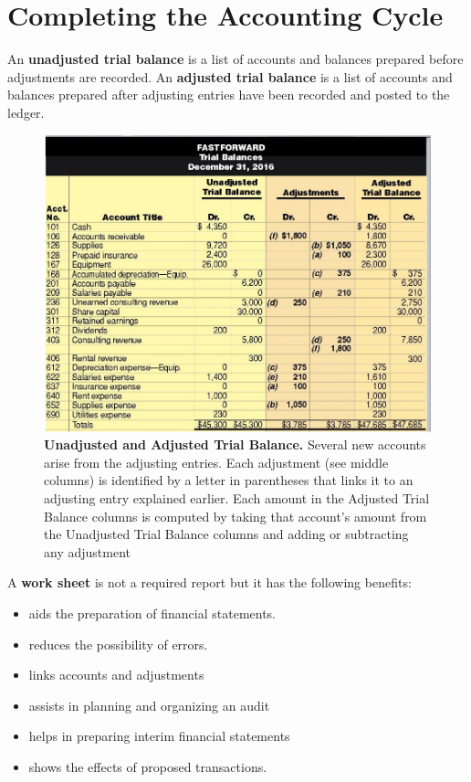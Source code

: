 \documentclass[../main.tex]{subfiles}
\begin{document}
	\section{Completing the Accounting Cycle}
	
	An \textbf{unadjusted trial balance} is a list of accounts and balances 
	prepared 
	before adjustments are recorded. An \textbf{adjusted trial balance} is a 
	list of 
	accounts and balances prepared after adjusting entries have been recorded 
	and posted to the ledger.
	
	\begin{figure}[ht]
		\centering
		\includegraphics[width=1\columnwidth]{images/c4/trial_balance_adjusted.png}
		\caption{\textbf{Unadjusted and Adjusted Trial Balance.} Several new 
		accounts arise from the adjusting entries. Each adjustment (see middle 
		columns) is identified by a letter in parentheses that links it to an 
		adjusting entry explained earlier. Each amount in the Adjusted Trial 
		Balance columns is computed by taking that account’s amount from the 
		Unadjusted Trial Balance columns and adding or subtracting any 
		adjustment}
	\end{figure}
	
	A \textbf{work sheet} is not a required report but it has the following 
	benefits:
	\begin{itemize}[noitemsep]
		\item aids the preparation of financial statements.
		\item reduces the possibility of errors.
		\item links accounts and adjustments
		\item assists in planning and organizing an audit 
		\item helps in preparing interim financial statements
		\item shows the effects of proposed transactions.
	\end{itemize}
	
\end{document}
